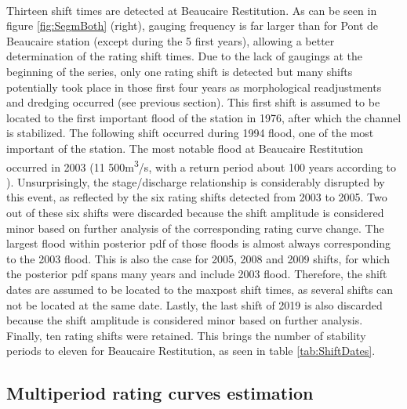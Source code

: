 \documentclass[11pt]{article}
\begin{document}
    \paragraph{}    
    Thirteen shift times are detected at Beaucaire Restitution. As can be seen in figure \ref{fig:SegmBoth} (right), gauging frequency is far larger than for Pont de Beaucaire station (except during the 5 first years), allowing a better determination of the rating shift times. 
    Due to the lack of gaugings at the beginning of the series, only one rating shift is detected but many shifts potentially took place in those first four years as morphological readjustments and dredging occurred (see previous section). This first shift is assumed to be located to the first important flood of the station in 1976, after which the channel is stabilized. The following shift occurred during 1994 flood, one of the most important of the station. The most notable flood at Beaucaire Restitution occurred in 2003 (11 500m\textsuperscript{3}/s, with a return period about 100 years according to \citet{medd_debit_2005}). Unsurprisingly, the stage/discharge relationship is considerably disrupted by this event, as reflected by the six rating shifts detected from 2003 to 2005. Two out of these six shifts were discarded because the shift amplitude is considered minor based on further analysis of the corresponding rating curve change. The largest flood within posterior pdf of those floods is almost always corresponding to the 2003 flood. This is also the case for 2005, 2008 and 2009 shifts, for which the posterior pdf spans many years and include 2003 flood. Therefore, the shift dates are assumed to be located to the maxpost shift times, as several shifts can not be located at the same date. Lastly, the last shift of 2019 is also discarded because the shift amplitude is considered minor based on further analysis. Finally, ten rating shifts were retained. This brings the number of stability periods to eleven for Beaucaire Restitution, as seen in table \ref{tab:ShiftDates}. 
        
    \subsection{Multiperiod rating curves estimation}
\end{document}
